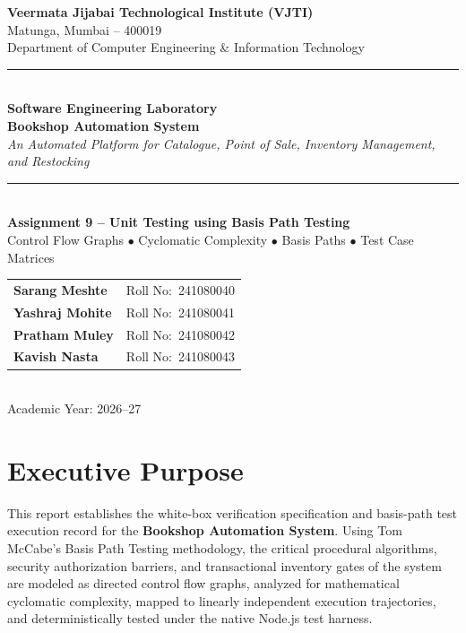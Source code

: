 \documentclass[12pt, a4paper]{report}
\begin{document}
\begin{titlepage}
  \centering
  {\fontsize{16}{20}\selectfont\bfseries
    Veermata Jijabai Technological Institute (VJTI)}\\[0.25cm]
  {\fontsize{12}{15}\selectfont Matunga, Mumbai -- 400019}\\[0.25cm]
  {\fontsize{12}{15}\selectfont
    Department of Computer Engineering \& Information Technology}\\[0.8cm]
  \rule{\textwidth}{1.5pt}\\[0.5cm]
  {\fontsize{13}{16}\selectfont\bfseries Software Engineering Laboratory}\\[0.25cm]
  {\fontsize{20}{24}\selectfont\bfseries\color{vjtiblue} Bookshop Automation System}\\[0.25cm]
  {\fontsize{11}{14}\selectfont\itshape An Automated Platform for Catalogue, Point of Sale, Inventory Management, and Restocking}\\[0.4cm]
  \rule{\textwidth}{1.5pt}\\[0.8cm]
  {\fontsize{14}{16}\selectfont\bfseries Assignment 9 -- Unit Testing using Basis Path Testing}\\[0.3cm]
  {\fontsize{10}{13}\selectfont Control Flow Graphs $\bullet$ Cyclomatic Complexity $\bullet$ Basis Paths $\bullet$ Test Case Matrices}\\[1.0cm]
  
  \begin{tabular}{ll}
    \textbf{Sarang Meshte}  & Roll No:\ 241080040 \\[5pt]
    \textbf{Yashraj Mohite} & Roll No:\ 241080041 \\[5pt]
    \textbf{Pratham Muley}  & Roll No:\ 241080042 \\[5pt]
    \textbf{Kavish Nasta}   & Roll No:\ 241080043 \\
  \end{tabular}\\[1.0cm]
  {\fontsize{11}{14}\selectfont Academic Year: 2026--27}
\end{titlepage}

\tableofcontents
\clearpage

\section*{Executive Purpose}
This report establishes the white-box verification specification and basis-path test execution record for the \textbf{Bookshop Automation System}. Using Tom McCabe's Basis Path Testing methodology, the critical procedural algorithms, security authorization barriers, and transactional inventory gates of the system are modeled as directed control flow graphs, analyzed for mathematical cyclomatic complexity, mapped to linearly independent execution trajectories, and deterministically tested under the native Node.js test harness.
\end{document}
